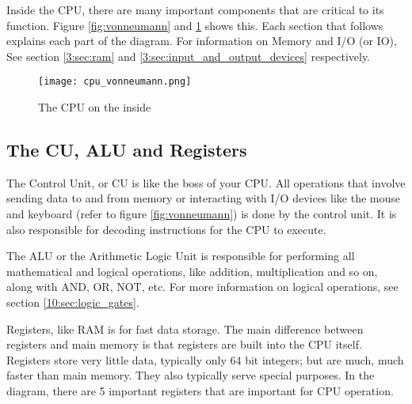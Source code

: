 \documentclass[../main.tex]{subfiles}
\begin{document}
Inside the CPU, there are many important components that are critical to its function. Figure \ref{fig:vonneumann} and \ref{fig:cpu_vonneumann} shows this. Each section that follows explains each part of the diagram. For information on Memory and I/O (or IO), See section \ref{3:sec:ram} and \ref{3:sec:input_and_output_devices} respectively.

\begin{figure}[H]
    \centering
    \texttt{[image: cpu\_vonneumann.png]}
    \caption{The CPU on the inside}
    \label{fig:cpu_vonneumann}
\end{figure}

\subsection{The CU, ALU and Registers}

The Control Unit, or CU is like the boss of your CPU. All operations that involve sending data to and from memory or interacting with I/O devices like the mouse and keyboard (refer to figure \ref{fig:vonneumann}) is done by the control unit. It is also responsible for decoding instructions for the CPU to execute.

The ALU or the Arithmetic Logic Unit is responsible for performing all mathematical and logical operations, like addition, multiplication and so on, along with AND, OR, NOT, etc. For more information on logical operations, see section \ref{10:sec:logic_gates}.

Registers, like RAM is for fast data storage. The main difference between registers and main memory is that registers are built into the CPU itself. Registers store very little data, typically only 64 bit integers; but are much, much faster than main memory. They also typically serve special purposes. In the diagram, there are 5 important registers that are important for CPU operation.
\end{document}
